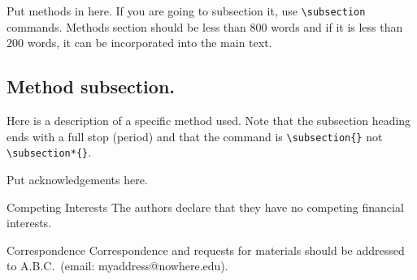 \documentclass{nature}
\begin{document}
\begin{methods}
Put methods in here.  If you are going to subsection it, use
\verb|\subsection| commands.  Methods section should be less than
800 words and if it is less than 200 words, it can be incorporated
into the main text.

\subsection{Method subsection.}

Here is a description of a specific method used.  Note that the
subsection heading ends with a full stop (period) and that the
command is \verb|\subsection{}| not \verb|\subsection*{}|.

\end{methods}







\begin{addendum}
 \item Put acknowledgements here.
 \item[Competing Interests] The authors declare that they have no
competing financial interests.
 \item[Correspondence] Correspondence and requests for materials
should be addressed to A.B.C.~(email: myaddress@nowhere.edu).
\end{addendum}



\end{document}
